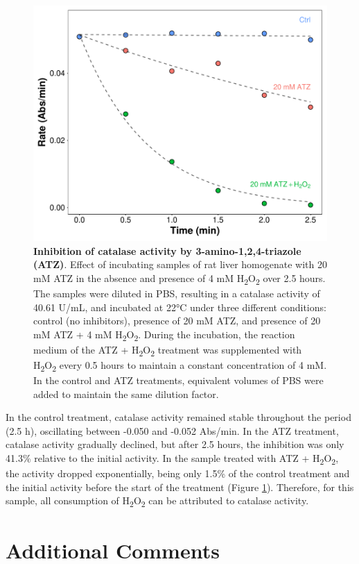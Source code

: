 \documentclass[
  9pt,
  american,
  a5paper,
  extrafontsizes,onecolumn,openright
  ]{memoir}
\begin{document}
\begin{figure}

{\centering \includegraphics[width=0.5\linewidth]{Volume-1_files/figure-latex/cat-fig-inhibitor-1} 

}

\caption{\textbf{Inhibition of catalase activity by 3-amino-1,2,4-triazole (ATZ)}. Effect of incubating samples of rat liver homogenate with 20 mM ATZ in the absence and presence of 4 mM H\textsubscript{2}O\textsubscript{2} over 2.5 hours. The samples were diluted in PBS, resulting in a catalase activity of 40.61 U/mL, and incubated at 22°C under three different conditions: control (no inhibitors), presence of 20 mM ATZ, and presence of 20 mM ATZ + 4 mM H\textsubscript{2}O\textsubscript{2}. During the incubation, the reaction medium of the ATZ + H\textsubscript{2}O\textsubscript{2} treatment was supplemented with H\textsubscript{2}O\textsubscript{2} every 0.5 hours to maintain a constant concentration of 4 mM. In the control and ATZ treatments, equivalent volumes of PBS were added to maintain the same dilution factor.}\label{fig:cat-fig-inhibitor}
\end{figure}

\normalsize

In the control treatment, catalase activity remained stable throughout the period (2.5 h), oscillating between -0.050 and -0.052 Abs/min. In the ATZ treatment, catalase activity gradually declined, but after 2.5 hours, the inhibition was only 41.3\% relative to the initial activity. In the sample treated with ATZ + H\textsubscript{2}O\textsubscript{2}, the activity dropped exponentially, being only 1.5\% of the control treatment and the initial activity before the start of the treatment (Figure \ref{fig:cat-fig-inhibitor}). Therefore, for this sample, all consumption of H\textsubscript{2}O\textsubscript{2} can be attributed to catalase activity.

\section{Additional Comments}\label{cat_additional_comments}
\end{document}
